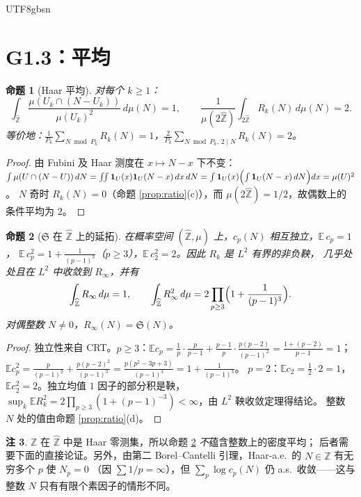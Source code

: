 \documentclass[11pt,a4paper]{article}
\newcommand{\Zhat}{\widehat{\mathbb Z}}
\newcommand{\Haar}{\mu}
\newcommand{\Sing}{\mathfrak S}
\newcommand{\status}[1]{\par\noindent\fbox{\textbf{状态：#1}}\par\smallskip}
\theoremstyle{plain}
\newtheorem{prop}{命题}[section]
\theoremstyle{definition}
\newtheorem{rem}[prop]{注}
\begin{document}
\begin{CJK}{UTF8}{gbsn}
\section{G1.3：平均}\label{sec:avg}

\begin{prop}[Haar 平均]\label{prop:haaravg}
对每个 $k\ge1$：
\[
\int_{\Zhat}\frac{\Haar(U_k\cap(N-U_k))}{\Haar(U_k)^2}\,d\Haar(N)=1,\qquad
\frac1{\Haar(2\Zhat)}\int_{2\Zhat}R_k(N)\,d\Haar(N)=2 .
\]
等价地：$\frac1{P_k}\sum_{N\bmod P_k}R_k(N)=1$，$\frac{2}{P_k}\sum_{N\bmod P_k,\,2\mid N}R_k(N)=2$。
\end{prop}
\status{已证}
\begin{proof}
由 Fubini 及 Haar 测度在 $x\mapsto N-x$ 下不变：
$\int\Haar(U\cap(N-U))\,dN=\iint\mathbf 1_U(x)\mathbf 1_U(N-x)\,dx\,dN=\int\mathbf 1_U(x)\Bigl(\int\mathbf 1_U(N-x)\,dN\Bigr)dx=\Haar(U)^2$。
$N$ 奇时 $R_k(N)=0$（命题 \ref{prop:ratio}(c)），而 $\Haar(2\Zhat)=1/2$，故偶数上的条件平均为 $2$。
\end{proof}

\begin{prop}[$\Sing$ 在 $\Zhat$ 上的延拓]\label{prop:martingale}
在概率空间 $(\Zhat,\Haar)$ 上，$c_p(N)$ 相互独立，$\mathbb E\,c_p=1$，
$\mathbb E\,c_p^2=1+\frac1{(p-1)^3}$（$p\ge3$），$\mathbb E\,c_2^2=2$。因此 $R_k$ 是 $L^2$ 有界的非负鞅，
几乎处处且在 $L^2$ 中收敛到 $R_\infty$，并有
\[
\int_{\Zhat}R_\infty\,d\Haar=1,\qquad \int_{\Zhat}R_\infty^2\,d\Haar=2\prod_{p\ge3}\Bigl(1+\frac1{(p-1)^3}\Bigr).
\]
对偶整数 $N\ne0$，$R_\infty(N)=\Sing(N)$。
\end{prop}
\status{已证}
\begin{proof}
独立性来自 CRT。$p\ge3$：$\mathbb E c_p=\frac1p\cdot\frac p{p-1}+\frac{p-1}p\cdot\frac{p(p-2)}{(p-1)^2}=\frac{1+(p-2)}{p-1}=1$；
$\mathbb E c_p^2=\frac{p}{(p-1)^2}+\frac{p(p-2)^2}{(p-1)^3}=\frac{p(p^2-3p+3)}{(p-1)^3}=1+\frac1{(p-1)^3}$。
$p=2$：$\mathbb E c_2=\frac12\cdot2=1$，$\mathbb E c_2^2=2$。独立均值 $1$ 因子的部分积是鞅，
$\sup_k\mathbb E R_k^2=2\prod_{p\ge3}(1+(p-1)^{-3})<\infty$，由 $L^2$ 鞅收敛定理得结论。
整数 $N$ 处的值由命题 \ref{prop:ratio}(d)。
\end{proof}

\begin{rem}
$\mathbb Z$ 在 $\Zhat$ 中是 Haar 零测集，所以命题 \ref{prop:martingale} \emph{不}蕴含整数上的密度平均；
后者需要下面的直接论证。另外，由第二 Borel--Cantelli 引理，Haar-a.e.\ 的 $N\in\Zhat$ 有无穷多个 $p$ 使 $N_p=0$
（因 $\sum1/p=\infty$），但 $\sum_p\log c_p(N)$ 仍 a.s.\ 收敛——这与整数 $N$ 只有有限个素因子的情形不同。
\end{rem}


\end{CJK}
\end{document}
